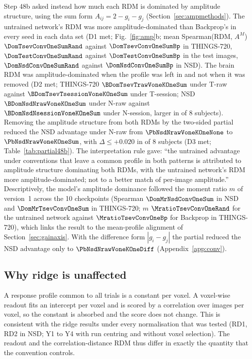 Step 48b asked instead how much each RDM is dominated by amplitude structure, using the sum form
$A_{ij} = 2 - g_i - g_j$ (Section~\ref{sec:ampmethods}). The untrained network's RDM was more
amplitude-dominated than Backprop's in every seed in each data set (D1 met; Fig.~\ref{fig:amp}b; mean Spearman(RDM, $A^M$)
$\DomTsevConvOneSumRand$ against $\DomTsevConvOneSumBp$ in THINGS-720, $\DomTestConvOneSumRand$ against
$\DomTestConvOneSumBp$ in the test images, $\DomNsdConvOneSumRand$ against $\DomNsdConvOneSumBp$ in NSD).
The brain RDM was amplitude-dominated when the profile was left in and not when it was removed (D2 met;
THINGS-720 $\BDomTsevTrawVoneKOneSum$ under T-raw against $\BDomTsevTsessionVoneKOneSum$ under T-session;
NSD $\BDomNsdNrawVoneKOneSum$ under N-raw against $\BDomNsdNsessionVoneKOneSum$ under N-session, larger in
\RuleDTwoNsd{} of 8 subjects). Removing the amplitude structure from both RDMs by the two-sided partial
reduced the NSD advantage under N-raw from $\PbNsdNrawVoneKOneNone$ to $\PbNsdNrawVoneKOneSum$, with
$\Delta \leq +0.020$ in \RuleDThreeLe{} of 8 subjects (D3 met; Table~\ref{tab:partial48b}). The
interpretation rule gave: ``the untrained advantage under conventions that leave a common profile in both
patterns is attributed to amplitude structure dominating both RDMs, with the untrained network's RDM more
amplitude-dominated; not to a better match of per-image amplitude.'' Descriptively, the model's amplitude
dominance followed the moment ratio $m$ of version~1 across the 10 checkpoints (Spearman
$\DomMrNsdConvOneSum$ in NSD and $\DomMrTsevConvOneSum$ in THINGS-720; $m$ $\MratioTsevConvOneRand$ for the
untrained network against $\MratioTsevConvOneBp$ for Backprop in THINGS-720), which links the result to the
mean-profile alignment of Section~\ref{sec:gainaxis}. With the difference form $|g_i - g_j|$ the partial
reduced the NSD advantage only to $\PbNsdNrawVoneKOneDiff$ (Appendix~\ref{app:conv}).

\subsection{Why ridge is unaffected}
\label{sec:ridgeunaffected}
A response profile common to all trials is a constant per voxel. A voxel-wise readout fits an intercept
per voxel and is scored by a correlation over images per voxel, so the constant is absorbed and the score
does not change. This is consistent with the ridge results under every normalisation that was tested
(RD1, RD2 in NSD; Y1 to Y4 with run centring and without voxel selection). The readout and the
correlation-distance RDM thus differ in exactly the quantity that the convention controls.

